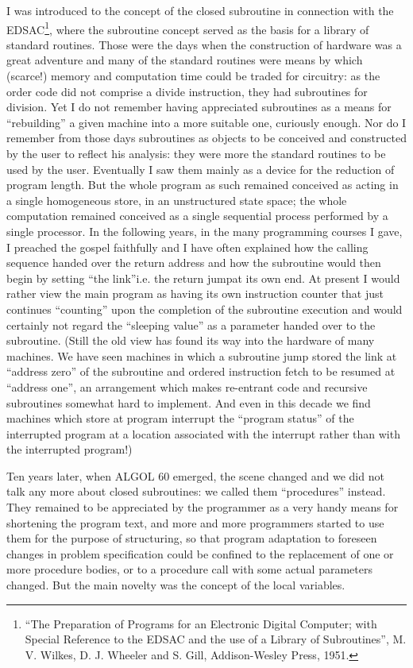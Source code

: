 \documentclass[twoside,11pt]{book}
\begin{document}
I was introduced to the concept of the closed subroutine in connection with the EDSAC\footnote{``The Preparation of Programs for an Electronic Digital Computer; with Special Reference to the EDSAC and the use of a Library of Subroutines'', M. V. Wilkes, D. J. Wheeler and S. Gill, Addison-Wesley Press, 1951.}, where the subroutine concept served as the basis for a library of standard routines. Those were the days when the construction of hardware was a great adventure and many of the standard routines were means by which (scarce!) memory and computation time could be traded for circuitry: as the order code did not comprise a divide instruction, they had subroutines for division. Yet I do not remember having appreciated subroutines as a means for ``rebuilding'' a given machine into a more suitable one, curiously enough. Nor do I remember from those days subroutines as objects to be conceived and constructed by the user to reflect his analysis: they were more the standard routines to be used by the user. Eventually I saw them mainly as a device for the reduction of program length. But the whole program as such remained conceived as acting in a single homogeneous store, in an unstructured state space; the whole computation remained conceived as a single sequential process performed by a single processor. In the following years, in the many programming courses I gave, I preached the gospel faithfully and I have often explained how the calling sequence handed over the return address and how the subroutine would then begin by setting ``the link''\textemdash{}i.e. the return jump\textemdash{}at its own end. At present I would rather view the main program as having its own instruction counter that just continues ``counting'' upon the completion of the subroutine execution and would certainly not regard the ``sleeping value'' as a parameter handed over to the subroutine. (Still the old view has found its way into the hardware of many machines. We have seen machines in which a subroutine jump stored the link at ``address zero'' of the subroutine and ordered instruction fetch to be resumed at ``address one'', an arrangement which makes re-entrant code and recursive subroutines somewhat hard to implement. And even in this decade we find machines which store at program interrupt the ``program status'' of the interrupted program at a location associated with the interrupt rather than with the interrupted program!)

Ten years later, when ALGOL 60 emerged, the scene changed and we did not talk any more about closed subroutines: we called them ``procedures'' instead. They remained to be appreciated by the programmer as a very handy means for shortening the program text, and more and more programmers started to use them for the purpose of structuring, so that program adaptation to foreseen changes in problem specification could be confined to the replacement of one or more procedure bodies, or to a procedure call with some actual parameters changed. But the main novelty was the concept of the local variables.
\end{document}
